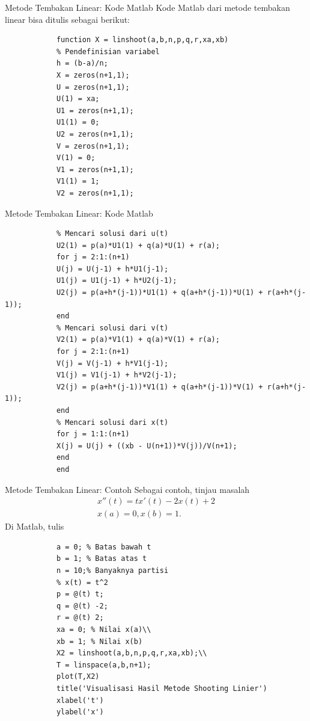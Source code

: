 \documentclass[xcolor={dvipsnames}, 9pt]{beamer}
\begin{document}
	\begin{frame}[fragile]{Metode Tembakan Linear: Kode Matlab}
		Kode Matlab dari metode tembakan linear bisa ditulis sebagai berikut:
		\begin{verbatim}
			function X = linshoot(a,b,n,p,q,r,xa,xb)
			% Pendefinisian variabel
			h = (b-a)/n;
			X = zeros(n+1,1);
			U = zeros(n+1,1);
			U(1) = xa;
			U1 = zeros(n+1,1);
			U1(1) = 0;
			U2 = zeros(n+1,1);
			V = zeros(n+1,1);
			V(1) = 0;
			V1 = zeros(n+1,1);
			V1(1) = 1;
			V2 = zeros(n+1,1);
		\end{verbatim}
	\end{frame}
	\begin{frame}[fragile]{Metode Tembakan Linear: Kode Matlab}
		\begin{verbatim}
			% Mencari solusi dari u(t)
			U2(1) = p(a)*U1(1) + q(a)*U(1) + r(a);
			for j = 2:1:(n+1)
			U(j) = U(j-1) + h*U1(j-1);
			U1(j) = U1(j-1) + h*U2(j-1);
			U2(j) = p(a+h*(j-1))*U1(1) + q(a+h*(j-1))*U(1) + r(a+h*(j-1));
			end
			% Mencari solusi dari v(t)
			V2(1) = p(a)*V1(1) + q(a)*V(1) + r(a);
			for j = 2:1:(n+1)
			V(j) = V(j-1) + h*V1(j-1);
			V1(j) = V1(j-1) + h*V2(j-1);
			V2(j) = p(a+h*(j-1))*V1(1) + q(a+h*(j-1))*V(1) + r(a+h*(j-1));
			end
			% Mencari solusi dari x(t)
			for j = 1:1:(n+1)
			X(j) = U(j) + ((xb - U(n+1))*V(j))/V(n+1);
			end
			end
		\end{verbatim}
	\end{frame}
	\begin{frame}[fragile]{Metode Tembakan Linear: Contoh}
		Sebagai contoh, tinjau masalah
		\begin{align*}
			x''(t) = tx'(t) - 2x(t) + 2 \\
			x(a) = 0, x(b) = 1.
		\end{align*}
		Di Matlab, tulis
		\begin{verbatim}
			a = 0; % Batas bawah t
			b = 1; % Batas atas t
			n = 10;% Banyaknya partisi
			% x(t) = t^2
			p = @(t) t;
			q = @(t) -2;
			r = @(t) 2;
			xa = 0; % Nilai x(a)\\
			xb = 1; % Nilai x(b)
			X2 = linshoot(a,b,n,p,q,r,xa,xb);\\
			T = linspace(a,b,n+1);
			plot(T,X2)
			title('Visualisasi Hasil Metode Shooting Linier')
			xlabel('t')
			ylabel('x')
		\end{verbatim}
	\end{frame}
\end{document}
